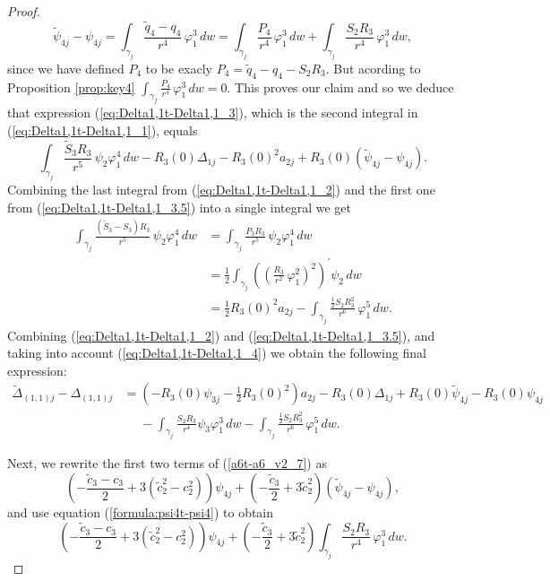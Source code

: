 \begin{proof}
\[ \tilde{\psi}_{4j}-\psi_{4j}=\int_{\gamma_j}\frac{\tilde{q}_4-q_4}{r^4}\,\varphi_1^3\,dw= \int_{\gamma_j}\frac{P_4}{r^4}\,\varphi_1^3\,dw+\int_{\gamma_j}\frac{S_2R_3}{r^4}\,\varphi_1^3\,dw, \]
since we have defined $P_4$ to be exacly $P_4=\tilde{q}_4-q_4-S_2R_3$. But acording to Proposition \ref{prop:key4} $\int_{\gamma_j}\frac{P_4}{r^4}\,\varphi_1^3\,dw=0$. This proves our claim and so we deduce that expression (\ref{eq:Delta1,1t-Delta1,1_3}), which is the second integral in (\ref{eq:Delta1,1t-Delta1,1_1}), equals
\begin{equation}\label{eq:Delta1,1t-Delta1,1_3.5}
\int_{\gamma_j}\frac{\widetilde{S}_3R_3}{r^5}\,\psi_2\varphi_1^4\,dw -R_3(0)\Delta_{1j}-R_3(0)^2a_{2j}+R_3(0)(\tilde{\psi}_{4j}-\psi_{4j}).
\end{equation}
Combining the last integral from (\ref{eq:Delta1,1t-Delta1,1_2}) and the first one from (\ref{eq:Delta1,1t-Delta1,1_3.5}) into a single integral we get
\begin{align}
\int_{\gamma_j}\frac{(\widetilde{S}_3-S_3)R_3}{r^5}\,\psi_2\varphi_1^4\,dw &= \int_{\gamma_j}\frac{P_3R_3}{r^5}\,\psi_2\varphi_1^4\,dw \nonumber \\
&= \frac{1}{2}\int_{\gamma_j}\left(\left(\frac{R_3}{r^2}\,\varphi_1^2\right)^2\right)^{\prime}\psi_2\,dw \nonumber \\
&= \frac{1}{2}R_3(0)^2a_{2j}-\int_{\gamma_j}\frac{\frac{1}{2}S_2R_3^2}{r^6}\,\varphi_1^5\,dw. \label{eq:Delta1,1t-Delta1,1_4}
\end{align}
Combining (\ref{eq:Delta1,1t-Delta1,1_2}) and (\ref{eq:Delta1,1t-Delta1,1_3.5}), and taking into account (\ref{eq:Delta1,1t-Delta1,1_4}) we obtain the following final expression:
\begin{align}
\widetilde{\Delta}_{(1,1)j}-\Delta_{(1,1)j} &= \left(-R_3(0)\psi_{3j}-\frac{1}{2}R_3(0)^2\right)a_{2j}-R_3(0)\Delta_{1j} +R_3(0)\tilde{\psi}_{4j}-R_3(0)\psi_{4j} \nonumber \\
&\phantom{=} -\int_{\gamma_j}\frac{S_2R_3}{r^4}\psi_3\varphi_1^3\,dw -\int_{\gamma_j}\frac{\frac{1}{2}S_2R_3^2}{r^6}\,\varphi_1^5\,dw. \label{eq:Delta1,1t-Delta1,1}
\end{align}

Next, we rewrite the first two terms of (\ref{a6t-a6_v2_7}) as
\[ \left(-\frac{\tilde{c}_3-c_3}{2}+3(\tilde{c}_2^2-c_2^2)\right)\psi_{4j} +\left(-\frac{\tilde{c}_3}{2}+3\tilde{c}_2^2\right)(\tilde{\psi}_{4j}-\psi_{4j}), \]
and use equation (\ref{formula:psi4t-psi4}) to obtain
\begin{equation}\label{eq:psi4t-psi4}
 \left(-\frac{\tilde{c}_3-c_3}{2}+3(\tilde{c}_2^2-c_2^2)\right)\psi_{4j}+\left(-\frac{\tilde{c}_3}{2}+3\tilde{c}_2^2\right)\int_{\gamma_j}\frac{S_2R_3}{r^4}\,\varphi_1^3\,dw.
\end{equation}


\end{proof}
